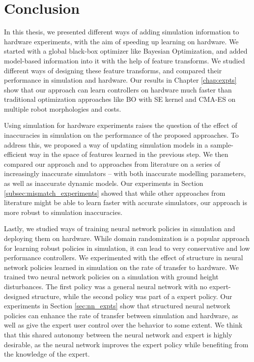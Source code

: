 \chapter{Conclusion}
\label{chap:conclusions}

In this thesis, we presented different ways of adding simulation information to hardware experiments, with the aim of speeding up learning on hardware. We started with a global black-box optimizer like Bayesian Optimization, and added model-based information into it with the help of feature transforms. We studied different ways of designing these feature transforms, and compared their performance in simulation and hardware. Our results in Chapter \ref{chap:expts} show that our approach can learn controllers on hardware much faster than traditional optimization approaches like BO with SE kernel and CMA-ES on multiple robot morphologies and costs. 

Using simulation for hardware experiments raises the question of the effect of inaccuracies in simulation on the performance of the proposed approaches. To address this, we proposed a way of updating simulation models in a sample-efficient way in the space of features learned in the previous step. We then compared our approach and to approaches from literature on a series of increasingly inaccurate simulators -- with both inaccurate modelling parameters, as well as inaccurate dynamic models. Our experiments in Section \ref{subsec:mismatch_experiments} showed that while other approaches from literature might be able to learn faster with accurate simulators, our approach is more robust to simulation inaccuracies.

Lastly, we studied ways of training neural network policies in simulation and deploying them on hardware. While domain randomization is a popular approach for learning robust policies in simulation, it can lead to very conservative and low performance controllers. We experimented with the effect of structure in neural network policies learned in simulation on the rate of transfer to hardware. We trained two neural network policies on a simulation with ground height disturbances. The first policy was a general neural network with no expert-designed structure, while the second policy was part of a expert policy. Our experiments in Section \ref{sec:nn_expts} show that structured neural network policies can enhance the rate of transfer between simulation and hardware, as well as give the expert user control over the behavior to some extent. We think that this shared autonomy between the neural network and expert is highly desirable, as the neural network improves the expert policy while benefiting from the knowledge of the expert.

